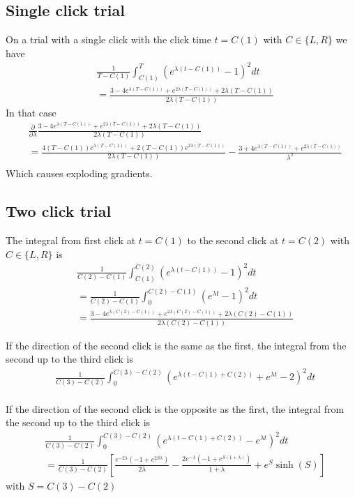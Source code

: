 \documentclass{article}
\theoremstyle{definition}
\theoremstyle{remark}
\begin{document}
\subsection{Single click trial}
On a trial with a single click with the click time $t=C(1)$ with $C\in\{L,R\}$ we have
\begin{align*}
&\frac{1}{T-C(1)}\int_{C(1)}^{T} \left(e^{\lambda(t-C(1))}-1\right)^2 dt\\
&= \frac{3 - 4 e^{\lambda (T-C(1))} + e^{2 \lambda (T-C(1))} + 2 \lambda (T-C(1))}{2 \lambda(T-C(1))}
\end{align*}
In that case 
\begin{align*}
&\frac{\partial}{\partial \lambda}\frac{3 - 4 e^{\lambda (T-C(1))} + e^{2 \lambda (T-C(1))} + 2 \lambda (T-C(1))}{2 \lambda(T-C(1))}\\
&= \frac{ 4 (T-C(1)) e^{\lambda (T-C(1))} + 2(T-C(1))e^{2 \lambda (T-C(1))}}{2 \lambda(T-C(1))} -\frac{3+ 4 e^{\lambda (T-C(1))} + e^{2 \lambda (T-C(1))} }{ \lambda^2}\\
\end{align*}
Which causes exploding gradients.


\subsection{Two  click trial}
The integral from first click at $t=C(1)$ to the second click at $t=C(2)$ with $C\in\{L,R\}$ is
\begin{align*}
&\frac{1}{C(2)-C(1)}\int_{C(1)}^{C(2)} \left(e^{\lambda(t-C(1))}-1\right)^2 dt\\
&=\frac{1}{C(2)-C(1)}\int_{0}^{C(2)-C(1)} \left(e^{\lambda t}-1\right)^2 dt\\
&= \frac{3 - 4 e^{\lambda (C(2)-C(1))} + e^{2 \lambda (C(2)-C(1))} + 2 \lambda (C(2)-C(1))}{2 \lambda(C(2)-C(1))}
\end{align*}

If the direction of the second click is the same as the first, the integral from the second up to the third click is
\begin{align*}
&\frac{1}{C(3)-C(2)}\int_{0}^{C(3)-C(2)} \left(e^{\lambda(t-C(1)+C(2))}+e^{\lambda t}-2\right)^2 dt\\
\end{align*}


If the direction of the second click is the opposite as the first, the integral from the second up to the third click is
\begin{align*}
&\frac{1}{C(3)-C(2)}\int_{0}^{C(3)-C(2)} \left(e^{\lambda(t-C(1)+C(2))}-e^{\lambda t}\right)^2 dt\\
&=\frac{1}{C(3)-C(2)}\left[\frac{e^{-2 \lambda} (-1 + e^{2 S \lambda})}{2 \lambda} - \frac{2 e^{- \lambda} (-1 + e^{S(1 + \lambda)})}{1 + \lambda}+ e^S \sinh(S)\right]
\end{align*}
with $S=C(3)-C(2)$
\end{document}

